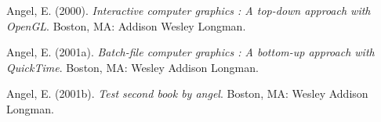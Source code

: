 \documentclass[12pt, twoside]{amherstthesis}
\newenvironment{CSLReferences}[2]%
  {}%
  {\par}
\begin{document}
\hypertarget{refs}{}
\begin{CSLReferences}{1}{0}
\leavevmode{}%
Angel, E. (2000). \emph{Interactive computer graphics : A top-down approach with OpenGL}. Boston, MA: Addison Wesley Longman.

\leavevmode{}%
Angel, E. (2001a). \emph{Batch-file computer graphics : A bottom-up approach with QuickTime}. Boston, MA: Wesley Addison Longman.

\leavevmode{}%
Angel, E. (2001b). \emph{Test second book by angel}. Boston, MA: Wesley Addison Longman.

\end{CSLReferences}
\end{document}
